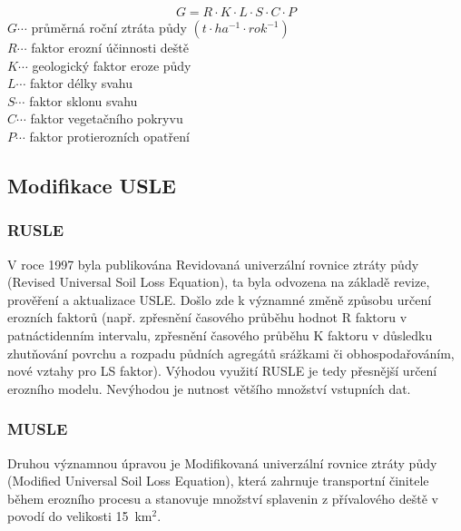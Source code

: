 \begin{align}
   \label{usle1978} G=R\cdot K\cdot L\cdot S\cdot C\cdot P
\end{align}
\hspace*{2cm}$G \cdots$ průměrná roční ztráta půdy $\left( t\cdot
ha^{-1}\cdot rok^{-1} \right)$\\
\hspace*{2cm}$R \cdots$ faktor erozní účinnosti deště \\
\hspace*{2cm}$K \cdots$ geologický faktor eroze půdy \\
\hspace*{2cm}$L \cdots$ faktor délky svahu \\
\hspace*{2cm}$S \cdots$ faktor sklonu svahu \\
\hspace*{2cm}$C \cdots$ faktor vegetačního pokryvu \\
\hspace*{2cm}$P \cdots$ faktor protierozních opatření \\

\subsection{Modifikace USLE}
\subsubsection{RUSLE}
V roce 1997 byla publikována Revidovaná univerzální rovnice ztráty
půdy (Revised Universal Soil Loss Equation), ta byla odvozena na
základě revize, prověření a aktualizace USLE. Došlo
zde k významné změně způsobu určení erozních faktorů (např. zpřesnění
časového průběhu hodnot R faktoru v patnáctidenním intervalu,
zpřesnění časového průběhu K faktoru v důsledku zhutňování povrchu a
rozpadu půdních agregátů srážkami či obhospodařováním, nové vztahy pro
LS faktor). Výhodou využití RUSLE je tedy přesnější určení
erozního modelu. Nevýhodou je nutnost většího množství vstupních
dat.\cite{rusle1997}
\subsubsection{MUSLE}
Druhou významnou úpravou je Modifikovaná univerzální rovnice ztráty
půdy (Modified Universal Soil Loss Equation), která zahrnuje
transportní činitele během erozního procesu a stanovuje množství
splavenin z přívalového deště v povodí do velikosti
15~km$^{2}$.\cite{musle1945}

